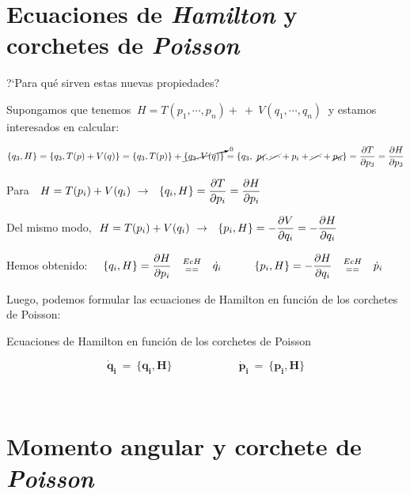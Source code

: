 \vspace{1cm}
\section{Ecuaciones de \emph{Hamilton} y corchetes de \emph{Poisson}}
?`Para qué sirven estas nuevas propiedades?

Supongamos que tenemos $\ H=T(p_1,\cdots , p_n) +\ + \ V(q_1,\cdots, q_n)\ $ y estamos interesados en calcular:

$\{q_3,H\}=\{q_3,T(p)+V(q)\}=\{q_3,T(p)\}+\cancelto{0}{ \{q_3,V(q)\} }=\{q_3,\ \cancel{p_1}, \cancel{\cdots} + p_i + \cancel{\cdots} + \cancel{p_n} \}=\displaystyle \pdv{T}{p_3}=\pdv{H}{p_3}$

Para $\ \displaystyle \ H=T(p_i)+V(q_i) \ \to \ \ \{q_i,H\}=\pdv{T}{p_i}=\pdv{H}{p_i}$

Del mismo modo, $\displaystyle \ H=T(p_i)+V(q_i) \ \to \ \ \{p_i,H\}=-\pdv{V}{q_i}=-\pdv{H}{q_i}$

Hemos obtenido:
$\quad  \{q_i,H\}=\displaystyle \pdv{H}{p_i} \quad  \begin{matrix} _{Ec H} \\ ^{==} \end{matrix}  \quad \dot q_i  \quad \qquad  \{p_i,H\}=-\displaystyle \pdv{H}{q_i} \quad  \begin{matrix} _{Ec H} \\ ^{==} \end{matrix}  \quad \dot p_i 
$


Luego, podemos formular las ecuaciones de Hamilton en función de los corchetes de Poisson:

\vspace{5mm}
\begin{large}
\begin{myblock}{Ecuaciones de Hamilton en función de los corchetes de Poisson}
$\, $

\begin{equation}
\label{T22EHCP}	
\boldsymbol{
\dot q_i \ = \ \{ q_i, H\} \qquad \qquad \qquad \dot p_i \ = \ \{ p_i, H\} }
\end{equation}

$\, $	
\end{myblock}
\end{large}


\vspace{1cm}
\section{Momento angular y corchete de \emph{Poisson}}
\label{T22CPL}


